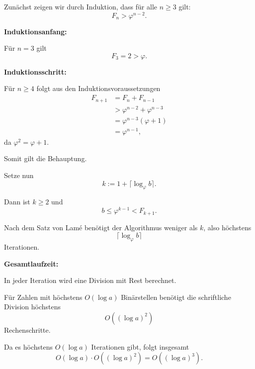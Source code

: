 


\begin{myproof}
  Zunächst zeigen wir durch Induktion,
  dass für alle $n\ge3$ gilt:
  \[
    F_n>\varphi^{n-2}.
  \]

  \textbf{Induktionsanfang:}

  Für $n=3$ gilt
  \[
    F_3=2>\varphi.
  \]

  \textbf{Induktionsschritt:}

  Für $n\ge4$ folgt aus den
  Induktionsvoraussetzungen
  \begin{align*}
    F_{n+1}
    &=F_n+F_{n-1}\\
    &>\varphi^{n-2}
      +\varphi^{n-3}\\
    &=\varphi^{n-3}(\varphi+1)\\
    &=\varphi^{n-1},
  \end{align*}
  da $\varphi^2=\varphi+1$.

  Somit gilt die Behauptung.

  \medskip
  Setze nun
  \[
    k:=1+\lceil\log_\varphi b\rceil.
  \]

  Dann ist $k\ge2$ und
  \[
    b\le\varphi^{k-1}<F_{k+1}.
  \]

  Nach dem Satz von Lamé benötigt
  der Algorithmus weniger als $k$,
  also höchstens
  \[
    \lceil\log_\varphi b\rceil
  \]
  Iterationen.

  \medskip
  \textbf{Gesamtlaufzeit:}

  In jeder Iteration wird eine Division
  mit Rest berechnet.

  Für Zahlen mit höchstens
  $O(\log a)$ Binärstellen benötigt
  die schriftliche Division höchstens
  \[
    O((\log a)^2)
  \]
  Rechenschritte.

  Da es höchstens $O(\log a)$
  Iterationen gibt, folgt insgesamt
  \[
    O(\log a)\cdot O((\log a)^2)
    =\boxed{O((\log a)^3)}.
  \]
\end{myproof}


